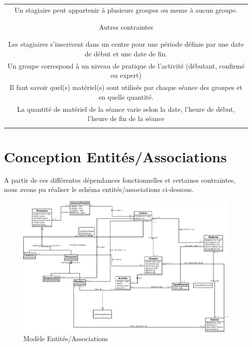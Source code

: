 \documentclass[10pt]{article}
\begin{document}
\begin{small}
\begin{tabular}{|c|}
Un stagiaire peut appartenir à plusieurs groupes ou meme à aucun groupe.\\ \\

\hline
\\Autres contraintes\\ \\
\hline

\\Les stagiaires s’inscrivent dans un centre pour une période définie par une date de début et une date de fin.\\

Un groupe correspond à un niveau de pratique de l’activité (débutant, confirmé ou expert)\\

Il faut savoir quel(s) matériel(s) sont utilisés par chaque séance des groupes et en quelle quantité.\\

La quantité de matériel de la séance varie selon la date, l'heure de début, l'heure de fin de la séance\\ \\

\hline

\end{tabular}
\end{small}

\section{Conception Entités/Associations}

A partir de ces différentes dépendances fonctionnelles et certaines contraintes, nous avons pu réaliser le schéma entités/associations
ci-dessous.

\begin{figure}[h!]
\includegraphics[scale=0.3]{DiaVLV.png}
\caption{Modèle Entités/Associations}
\end{figure}
\end{document}
